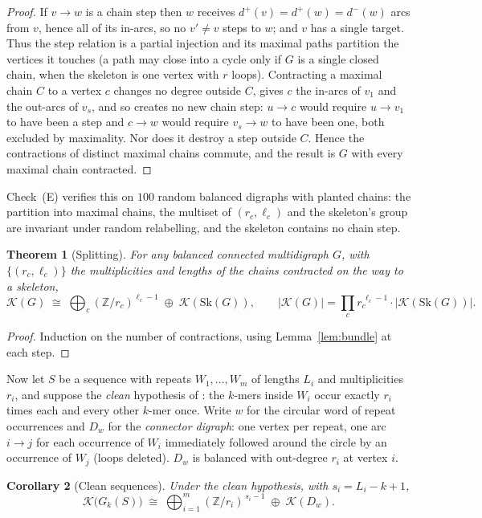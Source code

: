 \documentclass[11pt]{article}
\theoremstyle{plain}
\newtheorem{theorem}{Theorem}
\newtheorem{corollary}[theorem]{Corollary}
\theoremstyle{definition}
\theoremstyle{remark}
\newcommand{\Z}{\mathbb{Z}}
\newcommand{\K}{\mathcal{K}}
\newcommand{\Sk}{\mathrm{Sk}}
\begin{document}
\begin{proof}
If $v\to w$ is a chain step then $w$ receives $d^+(v)=d^+(w)=d^-(w)$ arcs from $v$, hence
all of its in-arcs, so no $v'\ne v$ steps to $w$; and $v$ has a single target. Thus the
step relation is a partial injection and its maximal paths partition the vertices it
touches (a path may close into a cycle only if $G$ is a single closed chain, when the
skeleton is one vertex with $r$ loops). Contracting a maximal chain $C$ to a vertex $c$
changes no degree outside $C$, gives $c$ the in-arcs of $v_1$ and the out-arcs of $v_s$,
and so creates no new chain step: $u\to c$ would require $u\to v_1$ to have been a step
and $c\to w$ would require $v_s\to w$ to have been one, both excluded by maximality. Nor
does it destroy a step outside $C$. Hence the contractions of distinct maximal chains
commute, and the result is $G$ with every maximal chain contracted.
\end{proof}

Check~(E) verifies this on $100$ random balanced digraphs with planted chains: the
partition into maximal chains, the multiset of $(r_c,\ell_c)$ and the skeleton's group are
invariant under random relabelling, and the skeleton contains no chain step.

\begin{theorem}[Splitting]\label{thm:split}
For any balanced connected multidigraph $G$, with $\{(r_c,\ell_c)\}$ the multiplicities
and lengths of the chains contracted on the way to a skeleton,
\[
\K(G)\;\cong\;\bigoplus_c(\Z/r_c)^{\ell_c-1}\;\oplus\;\K(\Sk(G)),
\qquad
|\K(G)|=\prod_c r_c^{\,\ell_c-1}\cdot|\K(\Sk(G))|.
\]
\end{theorem}

\begin{proof}
Induction on the number of contractions, using Lemma~\ref{lem:bundle} at each step.
\end{proof}

Now let $S$ be a sequence with repeats $W_1,\dots,W_m$ of lengths $L_i$ and
multiplicities $r_i$, and suppose the \emph{clean} hypothesis of \cite{Bio1}: the $k$-mers
inside $W_i$ occur exactly $r_i$ times each and every other $k$-mer once. Write $w$ for
the circular word of repeat occurrences and $D_w$ for the \emph{connector digraph}: one
vertex per repeat, one arc $i\to j$ for each occurrence of $W_i$ immediately followed
around the circle by an occurrence of $W_j$ (loops deleted). $D_w$ is balanced with
out-degree $r_i$ at vertex $i$.

\begin{corollary}[Clean sequences]\label{cor:clean}
Under the clean hypothesis, with $s_i=L_i-k+1$,
\[
\K\bigl(G_k(S)\bigr)\;\cong\;\bigoplus_{i=1}^{m}(\Z/r_i)^{\,s_i-1}\;\oplus\;\K(D_w).
\]
\end{corollary}
\end{document}
